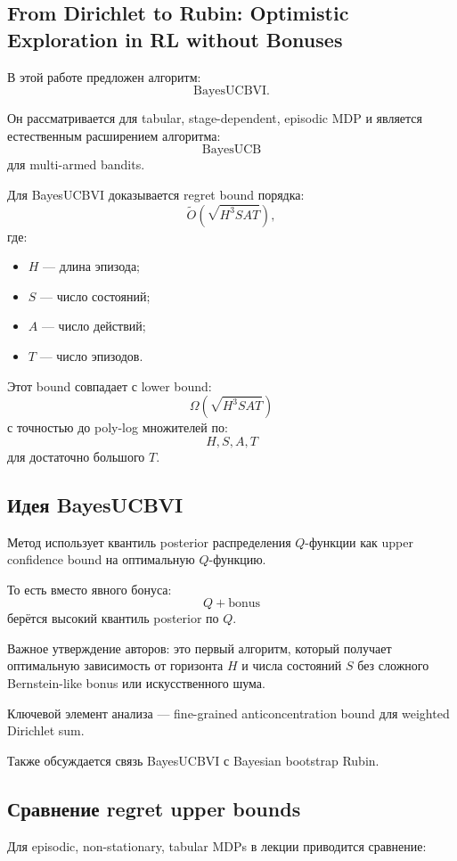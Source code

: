 \documentclass[12pt,a4paper]{article}
\begin{document}
\subsection{From Dirichlet to Rubin: Optimistic Exploration in RL without Bonuses}

В этой работе предложен алгоритм:
\[
\text{BayesUCBVI}.
\]

Он рассматривается для tabular, stage-dependent, episodic MDP и является естественным расширением алгоритма:
\[
\text{BayesUCB}
\]
для multi-armed bandits.

Для BayesUCBVI доказывается regret bound порядка:
\[
\widetilde O
\left(
\sqrt{H^3SAT}
\right),
\]
где:
\begin{itemize}
    \item $H$ --- длина эпизода;
    \item $S$ --- число состояний;
    \item $A$ --- число действий;
    \item $T$ --- число эпизодов.
\end{itemize}

Этот bound совпадает с lower bound:
\[
\Omega
\left(
\sqrt{H^3SAT}
\right)
\]
с точностью до poly-log множителей по:
\[
H,S,A,T
\]
для достаточно большого $T$.

\subsection{Идея BayesUCBVI}

Метод использует квантиль posterior распределения $Q$-функции как upper confidence bound на оптимальную $Q$-функцию.

То есть вместо явного бонуса:
\[
Q+\text{bonus}
\]
берётся высокий квантиль posterior по $Q$.

Важное утверждение авторов: это первый алгоритм, который получает оптимальную зависимость от горизонта $H$ и числа состояний $S$ без сложного Bernstein-like bonus или искусственного шума.

Ключевой элемент анализа --- fine-grained anticoncentration bound для weighted Dirichlet sum.

Также обсуждается связь BayesUCBVI с Bayesian bootstrap Rubin.

\subsection{Сравнение regret upper bounds}

Для episodic, non-stationary, tabular MDPs в лекции приводится сравнение:
\end{document}

